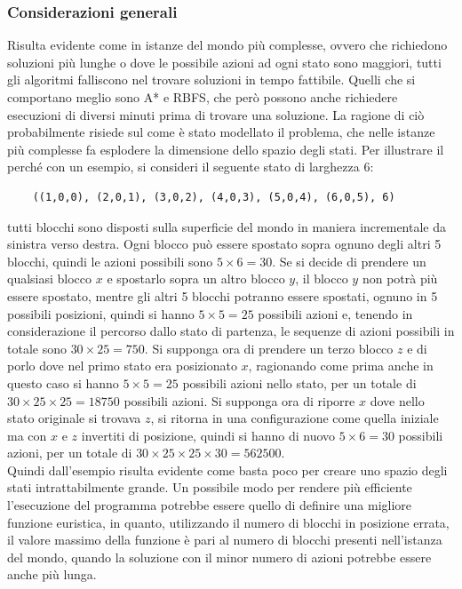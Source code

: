 \documentclass{article}
\begin{document}
	\subsubsection{Considerazioni generali}
	Risulta evidente come in istanze del mondo più complesse, ovvero che richiedono soluzioni più lunghe o dove le possibile azioni ad ogni stato sono maggiori, tutti gli algoritmi falliscono nel trovare soluzioni in tempo fattibile. Quelli che si comportano meglio sono A* e RBFS, che però possono anche richiedere esecuzioni di diversi minuti prima di trovare una soluzione. La ragione di ciò probabilmente risiede sul come è stato modellato il problema, che nelle istanze più complesse fa esplodere la dimensione dello spazio degli stati. Per illustrare il perché con un esempio, si consideri il seguente stato di larghezza 6:
	\begin{verbatim}
	((1,0,0), (2,0,1), (3,0,2), (4,0,3), (5,0,4), (6,0,5), 6)
	\end{verbatim}
	tutti blocchi sono disposti sulla superficie del mondo in maniera incrementale da sinistra verso destra. Ogni blocco può essere spostato sopra ognuno degli altri 5 blocchi, quindi le azioni possibili sono $5 \times 6 = 30$. Se si decide di prendere un qualsiasi blocco $x$ e spostarlo sopra un altro blocco $y$, il blocco $y$ non potrà più essere spostato, mentre gli altri 5 blocchi potranno essere spostati, ognuno in 5 possibili posizioni, quindi si hanno $5 \times 5 = 25$ possibili azioni e, tenendo in considerazione il percorso dallo stato di partenza, le sequenze di azioni possibili in totale sono $30 \times 25 = 750$. Si supponga ora di prendere un terzo blocco $z$ e di porlo dove nel primo stato era posizionato $x$, ragionando come prima anche in questo caso si hanno $5 \times 5 = 25$ possibili azioni nello stato, per un totale di $30 \times 25 \times 25 = 18750$ possibili azioni. Si supponga ora di riporre $x$ dove nello stato originale si trovava $z$, si ritorna in una configurazione come quella iniziale ma con $x$ e $z$ invertiti di posizione, quindi si hanno di nuovo $5 \times 6 = 30$ possibili azioni, per un totale di $30 \times 25 \times 25 \times 30 = 562500$.\\Quindi dall'esempio risulta evidente come basta poco per creare uno spazio degli stati intrattabilmente grande. Un possibile modo per rendere più efficiente l'esecuzione del programma potrebbe essere quello di definire una migliore funzione euristica, in quanto, utilizzando il numero di blocchi in posizione errata, il valore massimo della funzione è pari al numero di blocchi presenti nell'istanza del mondo, quando la soluzione con il minor numero di azioni potrebbe essere anche più lunga.
	
\end{document}
